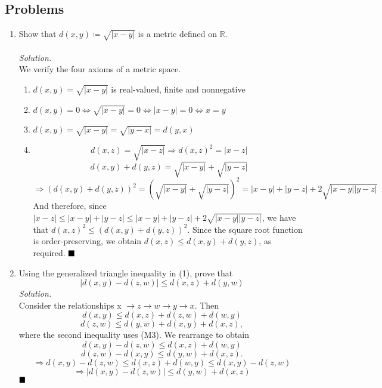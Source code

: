 \documentclass[11pt]{article}
\begin{document}
\subsection{Problems}
\begin{enumerate}
    \item Show that $d(x,y) \coloneq \sqrt{|x-y|}$ is a metric defined on $\mathbb{R}$.
    \\\\
    \textit{Solution.}
    \\
    We verify the four axioms of a metric space. 
    \begin{enumerate}[label=(M\arabic*), left=1cm]
    \item $\mathit{d(x, y) = \sqrt{|x-y|}}$ is real-valued, finite and nonnegative
    \item $\mathit{d}(x, y) = 0 \iff \sqrt{|x - y|} = 0 \iff |x - y| = 0 \iff x = y$
    \item $\mathit{d}(x, y) = \sqrt{|x - y|} = \sqrt{|y - x|} = \mathit{d}(y, x)$
    \item $$\textit{d}(x, z) = \sqrt{|x - z|} \Rightarrow \textit{d}(x, z)^2 = |x - z|$$
    $$\mathit{d}(x, y) + \mathit{d}(y, z) = \sqrt{|x - y|} + \sqrt{|y - z|} $$
    $$ \Rightarrow (\textit{d}(x, y) + \textit{d}(y, z))^2 = (\sqrt{|x - y|} + \sqrt{|y - z|})^2 = |x - y| + |y - z| + 2\sqrt{|x-y||y-z|}$$
    And therefore, since $|x - z| \leq |x - y| + |y - z| \leq |x - y| + |y - z| + 2\sqrt{|x-y||y-z|}$, we have that $\textit{d}(x, z)^2 \leq (\textit{d}(x, y) + \textit{d}(y, z))^2$. Since the square root function is order-preserving, we obtain $\textit{d}(x, z) \leq \textit{d}(x, y) + \textit{d}(y, z)$, as required.
    $\hfill \blacksquare$
    \end{enumerate}
    \item Using the generalized triangle inequality in (1), prove that $$|d(x, y) - d(z, w)| \leq d(x,z) + d(y,w)$$
    \textit{Solution.}
    \\ Consider the relationships x $\rightarrow z \rightarrow w \rightarrow y \rightarrow x$. Then
    $$ d(x, y) \leq d(x, z) + d(z, w) + d(w, y)$$
    $$ d(z, w) \leq d(y, w) + d(x, y) + d (x, z), $$
    where the second inequality uses (M3). We rearrange to obtain
    $$ d(x, y) - d(z, w) \leq d(x, z)+ d(w, y)$$
    $$ d(z, w) - d(x, y) \leq d(y, w) + d (x, z).$$
    $$ \Rightarrow d(x, y) - d(z, w) \leq d(x, z)+ d(w, y) \leq d(x, y) - d(z, w)$$
    $$ \Rightarrow |d(x, y) - d(z, w)| \leq d(y, w) + d (x, z)$$
    $\hfill \blacksquare$
\end{enumerate}
\end{document}
